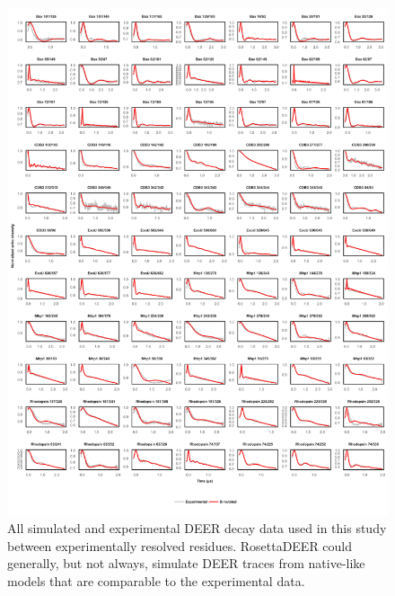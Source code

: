 \begin{figure}[h]
\centering
\includegraphics[width=5.5in]{Figures/rosettadeer_supp_alltraces.pdf}
 \caption[All simulated and experimental DEER decay data used in this study between experimentally resolved residues.]{All simulated and experimental DEER decay data used in this study between experimentally resolved residues. RosettaDEER could generally, but not always, simulate DEER traces from native-like models that are comparable to the experimental data.}
\label{fig:rosettadeer_supp_alltraces}
\end{figure}

